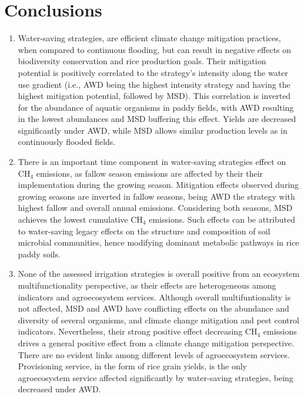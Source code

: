 \chapter*{\Huge Conclusions}
\thispagestyle{thesis} %

\begin{enumerate}
\item Water-saving strategies, are efficient climate change mitigation practices, when compared to continuous flooding, but can result in negative effects on biodiversity conservation and rice production goals. Their mitigation potential is positively correlated to the strategy's intensity along the water use gradient (i.e., AWD being the highest intensity strategy and having the highest mitigation potential, followed by MSD). This correlation is inverted for the abundance of aquatic organisms in paddy fields, with AWD resulting in the lowest abundances and MSD buffering this effect. Yields are decreased significantly under AWD, while MSD allows similar production levels as in continuously flooded fields.\\ 

\item There is an important time component in water-saving strategies effect on CH$_{4}$ emissions, as fallow season emissions are affected by their their implementation during the growing season. Mitigation effects observed during growing seasons are inverted in fallow seasons, being AWD the strategy with highest fallow and overall annual emissions. Considering both seasons, MSD achieves the lowest cumulative CH$_{4}$ emissions. Such effects can be attributed to water-saving legacy effects on the structure and composition of soil microbial communities, hence modifying dominant metabolic pathways in rice paddy soils.\\

\item None of the assessed irrigation strategies is overall positive from an ecosystem multifunctionality perspective, as their effects are heterogeneous among indicators and agroecosystem services. Although overall multifuntionality is not affected, MSD and AWD have conflicting effects on the abundance and diversity of several organisms, and climate change mitigation and pest control indicators. Nevertheless, their strong positive effect decreasing CH$_{4}$ emissions drives a general positive effect from a climate change mitigation perspective. There are no evident links among different levels of agroecosystem services. Provisioning service, in the form of rice grain yields, is the only agroecosystem service affected significantly by water-saving strategies, being decreased under AWD.\\


\end{enumerate}
